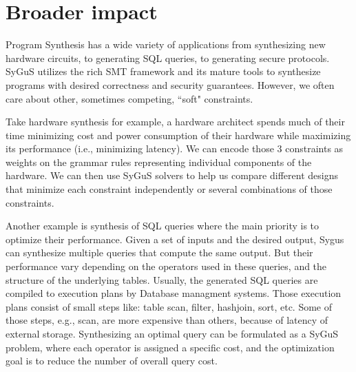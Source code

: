 \section{Broader impact}
\label{sec:impact}
Program Synthesis has a wide variety of applications from synthesizing new hardware circuits, to generating SQL queries, to generating secure protocols.
%
SyGuS utilizes the rich SMT framework and its mature tools to synthesize programs with desired correctness and security guarantees.
%
However, we often care about other, sometimes competing, ``soft" constraints.
%

Take hardware synthesis for example, a hardware architect spends much of their time minimizing cost and power consumption of their hardware while maximizing its performance (i.e., minimizing latency).
%
We can encode those 3 constraints as weights on the grammar rules representing individual components of the hardware.
%
We can then use SyGuS solvers to help us compare different designs that minimize each constraint independently or several combinations of those constraints.
%

Another example is synthesis of SQL queries where the main priority is to optimize their performance.
%
Given a set of inputs and the desired output, Sygus can synthesize multiple queries that compute the same output.  
%
But their performance vary depending on the operators used in these queries, and the structure of the underlying tables. 
%
Usually, the generated SQL queries are compiled to execution plans by Database managment systems.
%
Those execution plans consist of small steps like: table scan, filter, hashjoin, sort, etc.
%
Some of those steps, e.g., scan, are more expensive than others, because of latency of external storage.
%
Synthesizing an optimal query can be formulated as a SyGuS problem, where each operator is assigned a specific cost, and the optimization goal is to reduce the number of overall query cost. 



%
%
%
%

